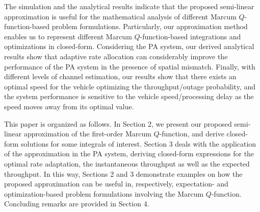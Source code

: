 The simulation and the analytical results indicate that the proposed semi-linear approximation is useful for the mathematical analysis of different Marcum $Q$-function-based problem formulations. Particularly, our approximation method enables us to represent different Marcum $Q$-function-based integrations and optimizations in closed-form. Considering the PA system, our derived analytical results show that adaptive rate allocation can considerably improve the performance of the PA system in the presence of spatial mismatch. Finally, with different levels of channel estimation, our results show that there exists an optimal speed for the vehicle optimizing the throughput/outage probability, and the system performance is sensitive to the vehicle speed/processing delay as the speed moves away from its optimal value. 


This paper is organized as follows. In Section 2, we present our proposed semi-linear approximation of the first-order Marcum $Q$-function, and derive closed-form solutions for some integrals of interest. Section 3 deals with the application of the approximation in the PA system,  deriving closed-form expressions for the optimal rate adaptation, the instantaneous throughput as well as the expected throughput.  In this way, Sections 2 and 3 demonstrate examples on how the proposed approximation can be useful in, respectively, expectation- and optimization-based problem formulations involving the Marcum $Q$-function. Concluding remarks are provided in Section 4. 





